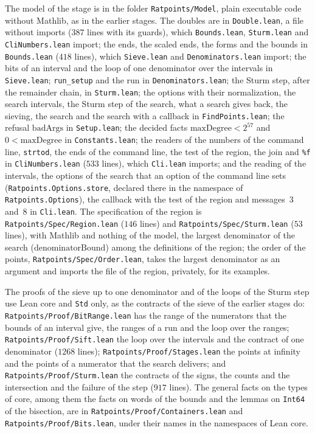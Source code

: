 The model of the stage is in the folder \verb|Ratpoints/Model|, plain executable code without
Mathlib, as in the earlier stages. The doubles are in \verb|Double.lean|, a file without imports
($387$ lines with its guards), which \verb|Bounds.lean|, \verb|Sturm.lean| and
\verb|CliNumbers.lean| import; the ends, the scaled ends, the forms and the bounds in
\verb|Bounds.lean| ($418$ lines), which \verb|Sieve.lean| and \verb|Denominators.lean| import; the
bits of an interval and the loop of one denominator over the intervals in \verb|Sieve.lean|;
\verb|run_setup| and the run in \verb|Denominators.lean|; the Sturm step, after the remainder chain,
in \verb|Sturm.lean|; the options with their normalization, the search intervals, the Sturm step of
the search, what a search gives back, the sieving, the search and the search with a callback in
\verb|FindPoints.lean|; the refusal $\mathrm{badArgs}$ in \verb|Setup.lean|; the decided facts
$\mathrm{maxDegree} < 2^{57}$ and $0 < \mathrm{maxDegree}$ in \verb|Constants.lean|; the readers of
the numbers of the command line, \verb|strtod|, the ends of the command line, the test of the
region, the join and \verb|%f| in \verb|CliNumbers.lean| ($533$ lines), which \verb|Cli.lean|
imports; and the reading of the intervals, the options of the search that an option of the command
line sets (\verb|Ratpoints.Options.store|, declared there in the namespace of
\verb|Ratpoints.Options|), the callback with the test of the region and messages~3 and~8 in
\verb|Cli.lean|. The specification of the region is \verb|Ratpoints/Spec/Region.lean| ($146$ lines)
and \verb|Ratpoints/Spec/Sturm.lean| ($53$ lines), with Mathlib and nothing of the model, the
largest denominator of the search ($\mathrm{denominatorBound}$) among the definitions of the region;
the order of the points, \verb|Ratpoints/Spec/Order.lean|, takes the largest denominator as an
argument and imports the file of the region, privately, for its examples.

The proofs of the sieve up to one denominator and of the loops of the Sturm step use Lean core and
\verb|Std| only, as the contracts of the sieve of the earlier stages do:
\verb|Ratpoints/Proof/BitRange.lean| has the range of the numerators that the bounds of an interval
give, the ranges of a run and the loop over the ranges; \verb|Ratpoints/Proof/Sift.lean| the loop
over the intervals and the contract of one denominator ($1268$ lines);
\verb|Ratpoints/Proof/Stages.lean| the points at infinity and the points of a numerator that the
search delivers; and \verb|Ratpoints/Proof/Sturm.lean| the contracts of the signs, the counts and
the intersection and the failure of the step ($917$ lines). The general facts on the types of core,
among them the facts on words of the bounds and the lemmas on \verb|Int64| of the bisection, are in
\verb|Ratpoints/Proof/Containers.lean| and \verb|Ratpoints/Proof/Bits.lean|, under their names in
the namespaces of Lean core.

